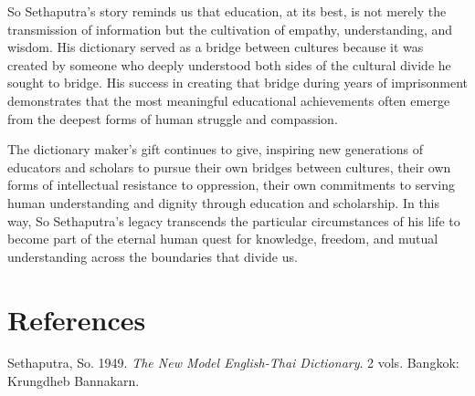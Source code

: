 \documentclass[
  Letterpaper,
]{scrbook}
\newlength{\cslhangindent}
\newenvironment{CSLReferences}[2] %
 {\begin{list}{}{%
  \setlength{\itemindent}{0pt}
  \setlength{\leftmargin}{0pt}
  \setlength{\parsep}{0pt}
  \ifodd #1
   \setlength{\leftmargin}{\cslhangindent}
   \setlength{\itemindent}{-1\cslhangindent}
  \fi
  \setlength{\itemsep}{#2\baselineskip}}}
 {\end{list}}
\begin{document}
So Sethaputra's story reminds us that education, at its best, is not
merely the transmission of information but the cultivation of empathy,
understanding, and wisdom. His dictionary served as a bridge between
cultures because it was created by someone who deeply understood both
sides of the cultural divide he sought to bridge. His success in
creating that bridge during years of imprisonment demonstrates that the
most meaningful educational achievements often emerge from the deepest
forms of human struggle and compassion.

The dictionary maker's gift continues to give, inspiring new generations
of educators and scholars to pursue their own bridges between cultures,
their own forms of intellectual resistance to oppression, their own
commitments to serving human understanding and dignity through education
and scholarship. In this way, So Sethaputra's legacy transcends the
particular circumstances of his life to become part of the eternal human
quest for knowledge, freedom, and mutual understanding across the
boundaries that divide us.


\chapter*{References}\label{references}


\label{refs}
\begin{CSLReferences}{1}{0}
Sethaputra, So. 1949. \emph{The New Model English-Thai Dictionary}. 2
vols. Bangkok: Krungdheb Bannakarn.

\end{CSLReferences}


\backmatter
\end{document}
